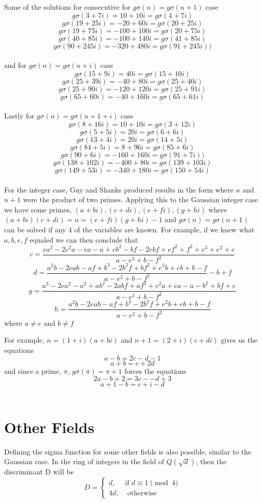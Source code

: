 \documentclass[12pt]{amsart}
\begin{document}
Some of the solutions for consecutive for $g\sigma(n) = g\sigma(n+1)$ case
\\
$$g\sigma(3 + 7i) = 10 + 10i = g\sigma(4 + 7i)$$
$$g\sigma(19 + 25i) = -20 + 60i = g\sigma(20 + 25i)$$
$$g\sigma(19 + 75i) = -100 + 100i = g\sigma(20 + 75i)$$
$$g\sigma(40 + 85i) = -100 + 140i  = g\sigma(41 + 85i)$$
$$g\sigma(90 + 245i) = -320 + 480i  = g\sigma(91 + 245i))$$
\\
and for $g\sigma(n) = g\sigma(n+i)$ case
\\
$$g\sigma(15 + 9i) = 40i = g\sigma(15 + 10i)$$
$$g\sigma(25 + 39i) = -40 + 80i  = g\sigma( 25 + 40i)$$
$$g\sigma(25 + 90i) = -120 + 120i  = g\sigma(25 + 91i)$$
$$g\sigma(65 + 60i) = -40 + 160i = g\sigma(65 + 61i)$$
\\
Lastly for $g\sigma(n) = g\sigma(n+1+i)$ case
\\
$$g\sigma(8 + 16i) = 10 + 10i = g\sigma(3 + 12i)$$
$$g\sigma(5 + 5i) = 20i = g\sigma(6 + 6i)$$
$$g\sigma(13 + 4i) = 20i = g\sigma(14 + 5i)$$
$$g\sigma(84 + 5i) = 8 + 96i  = g\sigma(85 + 6i)$$
$$g\sigma(90 + 6i) = -160 + 160i  = g\sigma(91 + 7i))$$
$$g\sigma(138 + 102i) = -400 + 80i = g\sigma(139 + 103i)$$
$$g\sigma(149 + 53i) = -340 + 180i = g\sigma(150 + 54i)$$
\\
For the integer case, Guy and Shanks produced results in the form where $n$ and $n+1$ were the product of two primes. Applying this to the Gaussian integer case we have some primes, $(a+bi), (c+di), (e+fi), (g+hi)$  where $(a+bi)(c+di) = n = (e+fi)(g+hi) - 1$ and $g\sigma(n) = g\sigma(n+1)$ can be solved if any 4 of the variables are known. For example, if we knew what $a,b,e,f$ equaled we can then conclude that
$$ c = \frac{ea^2 - 2e^2a-ea-a+eb^2-bf-2ebf+ef^2 + f^2 + e^3 + e^2+e}{{a-e}^2 + {b-f}^2}$$
$$ d = \frac{a^2b - 2eab - af + b^3 -2b^2f +bf^2 + e^2b +eb + b -f} {{a-e}^2 + {b-f}^2} - b + f$$
$$ g = \frac{a^3 -2ea^2 - a^2 + ab^2 -2abf + af^2 + e^2a +ea -a-b^2+bf+e}{{a-e}^2 + {b-f}^2}$$
$$ h = \frac{a^2b-2eab-af+b^3-2b^2f+e^2b+eb+b-f}{{a-e}^2 + {b-f}^2}$$
where $a\neq e$ and $b \neq f$

For example, $n = (1+i)(a+bi)$ and $n+1 = (2 + i)(c+di)$ gives us the equations $$ a - b = 2c - d -1$$ $$a + b = c + 2d$$ and since a prime, $\pi$,  $g\sigma(\pi) = \pi + 1$ forces the equations $$2a - b + 2 = 3c - -d + 3$$ $$a + 1 - b = c + i - d$$ 
\\

\section{Other Fields}
Defining the sigma function for some other fields is also possible, similar to the Gaussian case. In the ring of integers in the field of $Q(\sqrt{d})$, then the discriminant D will be
$$
D =
\begin{cases}
d, & \text{if }d\equiv 1\pmod {4} \\
4d, & \text{ otherwise}
\end{cases}
$$
\end{document}

